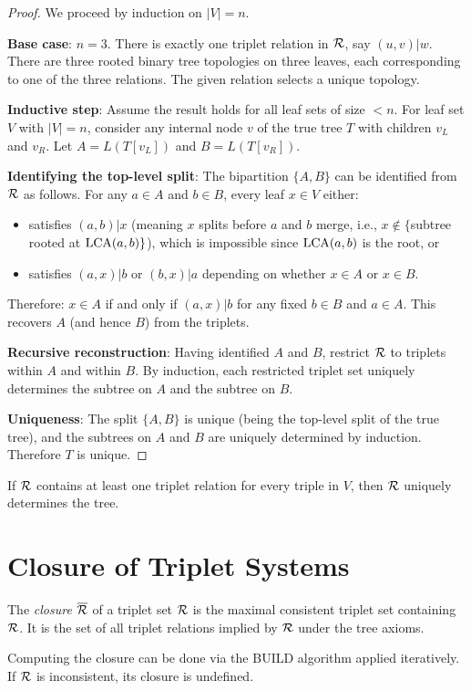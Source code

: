 \begin{proof}
We proceed by induction on $|V| = n$.

\textbf{Base case}: $n = 3$. There is exactly one triplet relation in $\mathcal{R}$, say $(u,v)|w$. There are three rooted binary tree topologies on three leaves, each corresponding to one of the three relations. The given relation selects a unique topology.

\textbf{Inductive step}: Assume the result holds for all leaf sets of size $< n$. For leaf set $V$ with $|V| = n$, consider any internal node $v$ of the true tree $T$ with children $v_L$ and $v_R$. Let $A = L(T[v_L])$ and $B = L(T[v_R])$.

\textbf{Identifying the top-level split}: The bipartition $\{A, B\}$ can be identified from $\mathcal{R}$ as follows. For any $a \in A$ and $b \in B$, every leaf $x \in V$ either:
\begin{itemize}
  \item satisfies $(a,b)|x$ (meaning $x$ splits before $a$ and $b$ merge, i.e., $x \notin \{$subtree rooted at $\operatorname{LCA}(a,b)\}$), which is impossible since $\operatorname{LCA}(a,b)$ is the root, or
  \item satisfies $(a,x)|b$ or $(b,x)|a$ depending on whether $x \in A$ or $x \in B$.
\end{itemize}
Therefore: $x \in A$ if and only if $(a,x)|b$ for any fixed $b \in B$ and $a \in A$. This recovers $A$ (and hence $B$) from the triplets.

\textbf{Recursive reconstruction}: Having identified $A$ and $B$, restrict $\mathcal{R}$ to triplets within $A$ and within $B$. By induction, each restricted triplet set uniquely determines the subtree on $A$ and the subtree on $B$.

\textbf{Uniqueness}: The split $\{A, B\}$ is unique (being the top-level split of the true tree), and the subtrees on $A$ and $B$ are uniquely determined by induction. Therefore $T$ is unique.
\end{proof}

\begin{corollary}
If $\mathcal{R}$ contains at least one triplet relation for every triple in $V$, then $\mathcal{R}$ uniquely determines the tree.
\end{corollary}

\section{Closure of Triplet Systems}

\begin{definition}
The \emph{closure} $\overline{\mathcal{R}}$ of a triplet set $\mathcal{R}$ is the maximal consistent triplet set containing $\mathcal{R}$. It is the set of all triplet relations implied by $\mathcal{R}$ under the tree axioms.
\end{definition}

Computing the closure can be done via the BUILD algorithm applied iteratively. If $\mathcal{R}$ is inconsistent, its closure is undefined.


